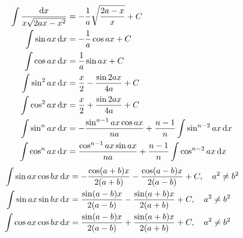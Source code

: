 \begin{align}
 \int \frac{\dif x}{x \sqrt{2ax-x^2}} &= - \frac{1}{a}  \sqrt{\frac{2a-x}{x}} +C\\
\int\sin ax \dif x &= - \frac{1}{a} \cos ax +C\\
\int\cos ax \dif x &= \frac{1}{a} \sin ax +C\\
\int\sin^2 ax \dif x &= \frac{x}{2} - \frac{\sin 2ax}{4a} +C\\
\int\cos^2 ax \dif x &= \frac{x}{2} + \frac{\sin 2ax}{4a} +C\\
 \int \sin^n ax \dif x &= - \frac{\sin^{n-1} ax \cos ax}{na} + \frac{n-1}{n} \int \sin^{n-2} ax \dif x\\
\int\cos^n ax \dif x &= \frac{\cos^{n-1} ax \sin ax}{na} + \frac{n-1}{n} \int \cos^{n-2} ax \dif x\label{مساوات_جدول_تکمل_اکسٹھ}
\end{align}
\begin{gather}
\begin{aligned}
\int\sin ax \cos bx \dif x &= - \frac{\cos (a+b)x}{2(a+b)}- \frac{\cos (a-b)x}{2(a-b)} +C, \quad a^2 \neq b^2\\
\int\sin ax \sin bx \dif x &= \frac{\sin (a-b)x}{2(a-b)}- \frac{\sin (a+b)x}{2(a+b)} +C,\quad a^2 \neq b^2\\
\int\cos ax \cos bx \dif x &= \frac{\sin (a-b)x}{2(a-b)}+ \frac{\sin (a+b)x}{2(a+b)} +C, \quad a^2 \neq b^2
\end{aligned}
\end{gather}

